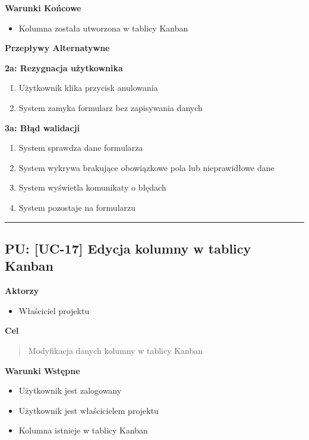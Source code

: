 \vspace{0.2cm}
\noindent\textbf{Warunki Końcowe}
\begin{itemize}
    \item Kolumna została utworzona w tablicy Kanban
\end{itemize}

\vspace{0.2cm}
\noindent\textbf{Przepływy Alternatywne}

\textbf{2a: Rezygnacja użytkownika}
\begin{enumerate}
    \item Użytkownik klika przycisk anulowania
    \item System zamyka formularz bez zapisywania danych
\end{enumerate}

\textbf{3a: Błąd walidacji}
\begin{enumerate}
    \item System sprawdza dane formularza
    \item System wykrywa brakujące obowiązkowe pola lub nieprawidłowe dane
    \item System wyświetla komunikaty o błędach
    \item System pozostaje na formularzu
\end{enumerate}


\hrule
\vspace{1cm}

\subsection*{PU: [UC-17] Edycja kolumny w tablicy Kanban}

\noindent\textbf{Aktorzy}
\begin{itemize}
    \item Właściciel projektu
\end{itemize}

\vspace{0.2cm}
\noindent\textbf{Cel}
\begin{quote}
    Modyfikacja danych kolumny w tablicy Kanban
\end{quote}

\vspace{0.2cm}
\noindent\textbf{Warunki Wstępne}
\begin{itemize}
    \item Użytkownik jest zalogowany
    \item Użytkownik jest właścicielem projektu
    \item Kolumna istnieje w tablicy Kanban
\end{itemize}

